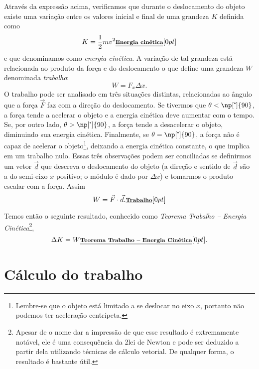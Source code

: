 Através da expressão acima, verificamos que durante o deslocamento do objeto existe uma variação entre os valores inicial e final de uma grandeza $K$ definida como
\begin{equation}
  K = \frac{1}{2} m v^2 \relax{\footnotesize\emph{\textbf{Energia cinética}}}[0pt]
\end{equation}
%
e que denominamos como \emph{energia cinética}. A variação de tal grandeza está relacionada ao produto da força e do deslocamento o que define uma grandeza $W$ denominada \emph{trabalho}:
\begin{equation}
  W = F_x \Delta x.
\end{equation}
%
O trabalho pode ser analisado em três situações distintas, relacionadas ao ângulo que a força $\vec{F}$ faz com a direção do deslocamento. Se tivermos que $\theta < \np[\tcdegree]{90}$, a força tende a acelerar o objeto e a energia cinética deve aumentar com o tempo. Se, por outro lado, $\theta > \np[\tcdegree]{90}$, a força tende a desacelerar o objeto, diminuindo sua energia cinética. Finalmente, se $\theta = \np[\tcdegree]{90}$, a força não é capaz de acelerar o objeto\footnote{Lembre-se que o objeto está limitado a se deslocar no eixo $x$, portanto não podemos ter aceleração centrípeta.}, deixando a energia cinética constante, o que implica em um trabalho nulo. Essas três observações podem ser conciliadas se definirmos um vetor $\vec{d}$ que descreva o deslocamento do objeto (a direção e sentido de $\vec{d}$ são a do semi-eixo $x$ positivo; o módulo é dado por $\Delta x$) e tomarmos o produto escalar com a força. Assim
\begin{equation}
  W = \vec{F}\cdot\vec{d}. \relax{\footnotesize\emph{\textbf{Trabalho}}}[0pt]
\end{equation}

Temos então o seguinte resultado, conhecido como \emph{Teorema Trabalho -- Energia Cinética}\footnote[][15mm]{Apesar de o nome dar a impressão de que esse resultado é extremamente notável, ele é uma consequência da 2\textordfeminine lei de Newton e pode ser deduzido a partir dela utilizando técnicas de cálculo vetorial. De qualquer forma, o resultado é bastante útil.},
\begin{equation}
  \Delta K = W \relax{\footnotesize\emph{\textbf{Teorema Trabalho -- Energia Cinética}}}[0pt].
\end{equation}

\section{Cálculo do trabalho}

